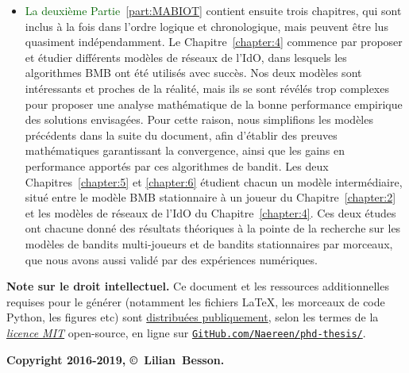 \begin{resume_fr}
\begin{itemize}
    \item
\textcolor{darkgreen}{La deuxième Partie~\ref{part:MABIOT}} contient ensuite trois chapitres, qui sont inclus à la fois dans l'ordre logique et chronologique, mais peuvent être lus quasiment indépendamment.
Le Chapitre~\ref{chapter:4} commence par proposer et étudier différents modèles de réseaux de l'IdO, dans lesquels les algorithmes BMB ont été utilisés avec succès. Nos deux modèles sont intéressants et proches de la réalité, mais ils se sont révélés trop complexes pour proposer une analyse mathématique de la bonne performance empirique des solutions envisagées.
Pour cette raison, nous simplifions les modèles précédents dans la suite du document,
afin d'établir des preuves mathématiques garantissant la convergence, ainsi que les gains en performance apportés par ces algorithmes de bandit.
Les deux Chapitres~\ref{chapter:5} et \ref{chapter:6} étudient chacun un modèle intermédiaire, situé entre le modèle BMB stationnaire à un joueur du Chapitre~\ref{chapter:2} et les modèles de réseaux de l'IdO du Chapitre~\ref{chapter:4}.
Ces deux études ont chacune donné des résultats théoriques à la pointe de la recherche sur les modèles de bandits multi-joueurs et de bandits stationnaires par morceaux, que nous avons aussi validé par des expériences numériques.

\end{itemize}


\vfill{}

\hr{}

\textbf{Note sur le droit intellectuel.}
%
Ce document et les ressources additionnelles requises pour le générer (notamment les fichiers \LaTeX, les morceaux de code Python, les figures etc)
sont \href{https://github.com/Naereen/phd-thesis/}{distribuées publiquement},
selon les termes de la \href{https://lbesson.mit-license.org/}{\emph{licence MIT}} open-source,
en ligne sur \href{https://github.com/Naereen/phd-thesis/}{\texttt{GitHub.com/Naereen/phd-thesis/}}.


\begin{center}
    \textbf{Copyright 2016-2019, \copyright ~Lilian~Besson.}
\end{center}


\end{resume_fr}
